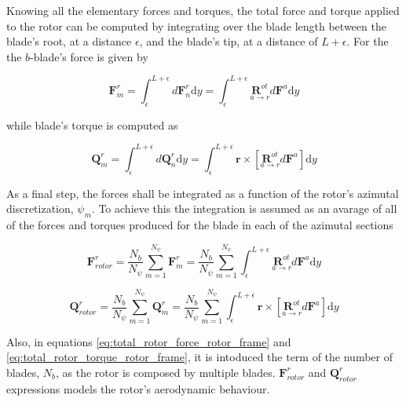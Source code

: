 Knowing all the elementary forces and torques, the total force and torque applied to the rotor can be computed by integrating over the blade length between the blade's root, at a distance $\epsilon$, and the blade's tip, at a distance of $L + \epsilon$. For the the $b$-blade's force is given by

\begin{equation}
    \mathbf{F}^r_{m} = \int_\epsilon^{L+\epsilon} d\mathbf{F}^r_n \mathrm{d}y = \int_\epsilon^{L+\epsilon} \underset{a \to r}{\boldsymbol{R}^{ot}}  d\mathbf{F}^a \mathrm{d}y
\end{equation}


\noindent while blade's torque is computed as

\begin{equation}
    \mathbf{Q}^r_{m} = \int_\epsilon^{L+\epsilon} d\mathbf{Q}^r_n  \mathrm{d}y = \int_\epsilon^{L+\epsilon} \mathbf{r} \times \left[ \underset{a \to r}{\boldsymbol{R}^{ot}}  d\mathbf{F}^a \right] \mathrm{d}y
\end{equation}

As a final step, the forces shall be integrated as a function of the rotor's azimutal discretization, $\psi_m$. To achieve this the integration is assumed as an avarage of all of the forces and torques produced for the blade in each of the azimutal sections

\begin{equation}
    \mathbf{F}_{rotor}^r = \frac{N_b }{N_{\psi}} \sum_{m=1}^{N_{\psi}} \mathbf{F}^r_{m} = \frac{N_b }{N_{\psi}} \sum_{m=1}^{N_{\psi}} \int_\epsilon^{L+\epsilon} \underset{a \to r}{\boldsymbol{R}^{ot}}  d\mathbf{F}^a \mathrm{d}y
    \label{eq:total_rotor_force_rotor_frame}
\end{equation}

\begin{equation}
    \mathbf{Q}_{rotor}^r = \frac{N_b }{N_{\psi}} \sum_{m=1}^{N_{\psi}} \mathbf{Q}^r_{m} = \frac{N_b }{N_{\psi}} \sum_{m=1}^{N_{\psi}} \int_\epsilon^{L+\epsilon} \mathbf{r} \times \left[ \underset{a \to r}{\boldsymbol{R}^{ot}}  d\mathbf{F}^a \right] \mathrm{d}y
    \label{eq:total_rotor_torque_rotor_frame}
\end{equation}

Also, in equations \ref{eq:total_rotor_force_rotor_frame} and \ref{eq:total_rotor_torque_rotor_frame}, it is intoduced the term of the number of blades, $N_b$, as the rotor is composed by multiple blades. $\mathbf{F}_{rotor}^r$ and $\mathbf{Q}_{rotor}^r$ expressions models the rotor's aerodynamic behaviour.


